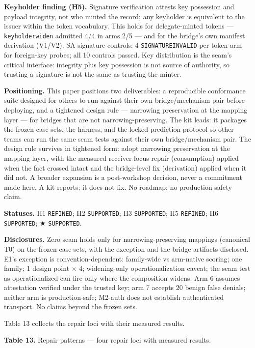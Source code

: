 \documentclass[
  10pt,
]{article}
\renewcommand{\_}{\origunderscore\allowbreak}
\begin{document}
\textbf{Keyholder finding (H5).} Signature verification attests key
possession and payload integrity, not who minted the record; any
keyholder is equivalent to the issuer within the token vocabulary. This
holds for delegate-minted tokens --- \texttt{keyholder\_widen} admitted
4/4 in arms 2/5 --- and for the bridge's own manifest derivation
(V1/V2). SA signature controls: 4 \texttt{SIGNATURE\_INVALID} per token
arm for foreign-key probes; all 10 controls passed. Key distribution is
the seam's critical interface: integrity plus key possession is not
source of authority, so trusting a signature is not the same as trusting
the minter.

\textbf{Positioning.} This paper positions two deliverables: a
reproducible conformance suite designed for others to run against their
own bridge/mechanism pair before deploying, and a tightened design rule
--- narrowing preservation at the mapping layer --- for bridges that are
not narrowing-preserving. The kit leads: it packages the frozen case
sets, the harness, and the locked-prediction protocol so other teams can
run the same seam tests against their own bridge/mechanism pair. The
design rule survives in tightened form: adopt narrowing preservation at
the mapping layer, with the measured receiver-locus repair (consumption)
applied when the fact crossed intact and the bridge-level fix
(derivation) applied when it did not. A broader expansion is a
post-workshop decision, never a commitment made here. A kit reports; it
does not fix. No roadmap; no production-safety claim.

\textbf{Statuses.} H1 \texttt{REFINED}; H2 \texttt{SUPPORTED}; H3
\texttt{SUPPORTED}; H5 \texttt{REFINED}; H6 \texttt{SUPPORTED}; ★
\texttt{SUPPORTED}.

\textbf{Disclosures.} Zero seam holds only for narrowing-preserving
mappings (canonical T0) on the frozen case sets, with the exception and
the bridge artifacts disclosed. E1's exception is convention-dependent:
family-wide vs arm-native scoring; one family; 1 design point × 4;
widening-only operationalization caveat; the seam test as
operationalized can fire only where the composition widens. Arm 6
assumes attestation verified under the trusted key; arm 7 accepts 20
benign false denials; neither arm is production-safe; M2-auth does not
establish authenticated transport. No claims beyond the frozen sets.

Table 13 collects the repair loci with their measured results.

\textbf{Table 13.} Repair patterns --- four repair loci with measured
results.
\end{document}
